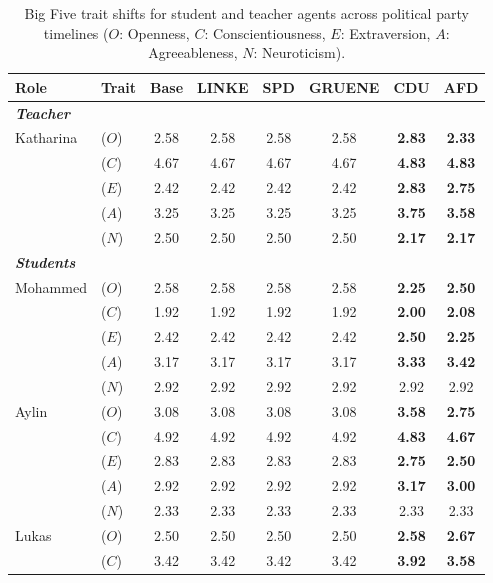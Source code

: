 \begin{table}[t]
\centering
\caption{Big Five trait shifts for student and teacher agents across political party timelines ($O$: Openness, $C$: Conscientiousness, $E$: Extraversion, $A$: Agreeableness, $N$: Neuroticism).}
\label{tab:agent_shifts}
\small
\setlength{\tabcolsep}{6pt}
\begin{tabular}{llcccccc}
\toprule
\textbf{Role} & \textbf{Trait} & \textbf{Base} & \textbf{LINKE} & \textbf{SPD} & \textbf{GRUENE} & \textbf{CDU} & \textbf{AFD} \\
\midrule
\multicolumn{8}{l}{\textit{\textbf{Teacher}}} \\
Katharina & ($O$) & 2.58 & 2.58 & 2.58 & 2.58 & \textbf{2.83} & \textbf{2.33} \\
 & ($C$) & 4.67 & 4.67 & 4.67 & 4.67 & \textbf{4.83} & \textbf{4.83} \\
 & ($E$) & 2.42 & 2.42 & 2.42 & 2.42 & \textbf{2.83} & \textbf{2.75} \\
 & ($A$) & 3.25 & 3.25 & 3.25 & 3.25 & \textbf{3.75} & \textbf{3.58} \\
 & ($N$) & 2.50 & 2.50 & 2.50 & 2.50 & \textbf{2.17} & \textbf{2.17} \\
\midrule
\multicolumn{8}{l}{\textit{\textbf{Students}}} \\
Mohammed & ($O$) & 2.58 & 2.58 & 2.58 & 2.58 & \textbf{2.25} & \textbf{2.50} \\
 & ($C$) & 1.92 & 1.92 & 1.92 & 1.92 & \textbf{2.00} & \textbf{2.08} \\
 & ($E$) & 2.42 & 2.42 & 2.42 & 2.42 & \textbf{2.50} & \textbf{2.25} \\
 & ($A$) & 3.17 & 3.17 & 3.17 & 3.17 & \textbf{3.33} & \textbf{3.42} \\
 & ($N$) & 2.92 & 2.92 & 2.92 & 2.92 & 2.92 & 2.92 \\
\addlinespace
Aylin & ($O$) & 3.08 & 3.08 & 3.08 & 3.08 & \textbf{3.58} & \textbf{2.75} \\
 & ($C$) & 4.92 & 4.92 & 4.92 & 4.92 & \textbf{4.83} & \textbf{4.67} \\
 & ($E$) & 2.83 & 2.83 & 2.83 & 2.83 & \textbf{2.75} & \textbf{2.50} \\
 & ($A$) & 2.92 & 2.92 & 2.92 & 2.92 & \textbf{3.17} & \textbf{3.00} \\
 & ($N$) & 2.33 & 2.33 & 2.33 & 2.33 & 2.33 & 2.33 \\
\addlinespace
Lukas & ($O$) & 2.50 & 2.50 & 2.50 & 2.50 & \textbf{2.58} & \textbf{2.67} \\
 & ($C$) & 3.42 & 3.42 & 3.42 & 3.42 & \textbf{3.92} & \textbf{3.58} \\

\end{tabular}
\end{table}
